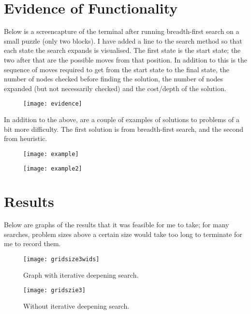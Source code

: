 \documentclass[a4paper,10pt]{article}
\begin{document}
\section{Evidence of Functionality}

Below is a screencapture of the terminal after running breadth-first search on a small puzzle (only two blocks). I have added a line to the search method so that each state the search expands is visualised.
The first state is the start state; the two after that are the possible moves from that position. 
In addition to this is the sequence of moves required to get from the start state to the final state, the number of nodes checked before finding the solution, the number of nodes expanded (but not necessarily checked) and the cost/depth of the solution. 

\begin{figure}[h]
	\centering
		\texttt{[image: evidence]}
\end{figure}

In addition to the above, are a couple of examples of solutions to problems of a bit more difficulty. The first solution is from breadth-first search, and the second from heuristic. 

\begin{figure}[h]
	\centering	
		\texttt{[image: example]}
\end{figure}

\begin{figure}[h]
	\centering
		\texttt{[image: example2]}
\end{figure}

\newpage

\section{Results}

Below are graphs of the results that it was feasible for me to take; for many searches, problem sizes above a certain size would take too long to terminate for me to record them. 

\begin{figure}[h]
	\caption{Graph with iterative deepening search.}
	\centering
		\texttt{[image: gridsize3wids]}
\end{figure}

\begin{figure}[h]
	\caption{Without iterative deepening search.}
	\centering
		\texttt{[image: gridszie3]}
\end{figure}
\end{document}
